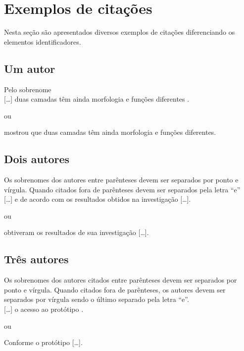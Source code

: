 \section{Exemplos de citações}

Nesta seção são apresentados diversos exemplos de citações diferenciando os elementos identificadores. 

\subsection{Um autor}

Pelo sobrenome\\

[\ldots] duas camadas têm ainda morfologia e funções diferentes \cite{Pereira2013}.

ou

 mostrou que duas camadas têm ainda morfologia e funções diferentes.\\


\subsection{Dois autores}

Os sobrenomes dos autores entre parênteses devem ser separados por ponto e vírgula. Quando citados fora de parênteses devem ser separados pela letra “e”\\

[\ldots] \cite{Ramos2014} e de acordo com os resultados obtidos na investigação [\ldots]. 

ou 

 obtiveram os resultados de sua investigação [\ldots]. \\

\subsection{Três autores}

Os sobrenomes dos autores citados entre parênteses devem ser separados por ponto e vírgula. Quando citados fora de parênteses, os autores devem ser separados por vírgula sendo o último separado pela letra “e”.\\

[\ldots] o acesso ao protótipo \cite{Oliveira2013}.

ou

Conforme  o protótipo [\ldots].\\


